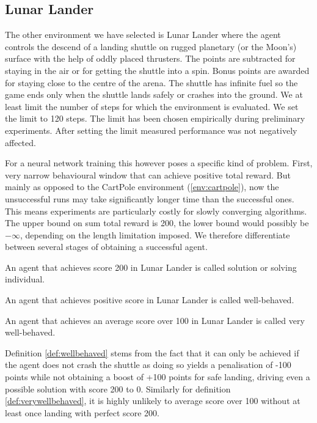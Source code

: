 \subsection{Lunar Lander}
The other environment we have selected is Lunar Lander where the agent controls the descend of a landing shuttle on rugged planetary (or the Moon's) surface with the help of oddly placed thrusters. The points are subtracted for staying in the air or for getting the shuttle into a spin. Bonus points are awarded for staying close to the centre of the arena.  The shuttle has infinite fuel so the game ends only when the shuttle lands safely or crashes into the ground. We at least limit the number of steps for which the environment is evaluated. We set the limit to 120 steps. The limit has been chosen empirically during preliminary experiments. After setting the limit measured performance was not negatively affected. 



For a neural network training this however poses a specific kind of problem. First, very narrow behavioural window that can achieve positive total reward. But mainly as opposed to the CartPole environment (\ref{env:cartpole}), now the unsuccessful runs may take significantly longer time than the successful ones. This means experiments are particularly costly for slowly converging algorithms. The upper bound on sum total reward is 200, the lower bound would possibly be $-\infty$, depending on the length limitation imposed. 
We therefore differentiate between several stages of obtaining a successful agent.

\begin{defn}
	An agent that achieves score 200 in Lunar Lander is called solution or solving individual.
\end{defn}
\begin{defn}
	\label{def:wellbehaved}
	An agent that achieves positive score  in Lunar Lander is called well-behaved.
\end{defn}
\begin{defn}
	\label{def:verywellbehaved}
	An agent that achieves an average score over 100 in Lunar Lander is called very well-behaved.
\end{defn}
 Definition \ref{def:wellbehaved} stems from the fact that it can only be achieved if the agent does not crash the shuttle as doing so yields a penalisation of -100 points while not obtaining a boost of +100 points for safe landing, driving even a possible solution with score 200 to 0. Similarly for definition \ref{def:verywellbehaved}, it is highly unlikely to average score over 100 without at least once landing with perfect score 200.
 
